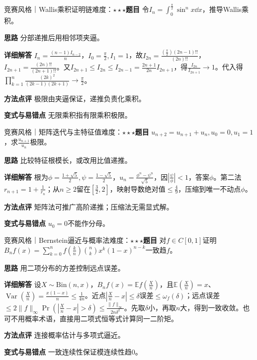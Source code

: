 \begin{example}{竞赛风格｜Wallis乘积证明链}{难度：$\star\star\star$}\label{deep:ex:limits_source_deep:wallis}\textbf{题目} 令$I_n=\int_0^{\frac{\pi}{2}}\sin^nx\dd x$，推导Wallis乘积。\par\textbf{思路} 分部递推后用相邻项夹逼。\par\textbf{详细解答} $I_n=\frac{(n-1)I_{n-2}}{n}$，$I_0=\frac{\pi}{2},I_1=1$，故$I_{2n}=\frac{(\frac{\pi}{2})(2n-1)!!}{(2n)!!}$，$I_{2n+1}=\frac{(2n)!!}{(2n+1)!!}$。又$I_{2n+1}\le I_{2n}\le I_{2n-1}=\frac{2n+1}{2n}I_{2n+1}$，得$\frac{I_{2n}}{I_{2n+1}}\to1$。代入得$\prod_{k=1}^n\frac{(2k)^2}{(2k-1)(2k+1)}\to\frac{\pi}{2}$。\par\textbf{方法点评} 极限由夹逼保证，递推负责化乘积。\par\textbf{变式与易错点} 无限乘积指有限乘积极限。\end{example}

\begin{example}{竞赛风格｜矩阵迭代与主特征值}{难度：$\star\star\star$}\label{deep:ex:limits_source_deep:matrix}\textbf{题目} $u_{n+2}=u_{n+1}+u_n,u_0=0,u_1=1$，求$\frac{u_{n+1}}{u_n}$极限。\par\textbf{思路} 比较特征根模长，或改用比值递推。\par\textbf{详细解答} 根为$\phi=\frac{1+\sqrt5}{2},\psi=\frac{1-\sqrt5}{2}$，$u_n=\frac{\phi^n-\psi^n}{\sqrt5}$，因$|\frac{\psi}{\phi}|<1$，答案$\phi$。第二法$r_{n+1}=1+\frac{1}{r_n}$；从$n\ge2$留在$[\frac{3}{2},2]$，映射导数绝对值$\le\frac{4}{9}$，压缩到唯一不动点$\phi$。\par\textbf{方法点评} 矩阵法可推广高阶递推；压缩法无需显式解。\par\textbf{变式与易错点} $u_0=0$不能作分母。\end{example}

\begin{example}{竞赛风格｜Bernstein逼近与概率法}{难度：$\star\star\star$}\label{deep:ex:limits_source_deep:probability}\textbf{题目} 对$f\in C[0,1]$证明$B_nf(x)=\sum_{k=0}^nf(\frac{k}{n})\binom nkx^k(1-x)^{n-k}$一致趋$f$。\par\textbf{思路} 用二项分布的方差控制远点误差。\par\textbf{详细解答} 设$X\sim\mathrm{Bin}(n,x)$，$B_nf(x)=\mathbb E f(\frac{X}{n})$，且$\mathbb E(\frac{X}{n})=x$、$\operatorname{Var}(\frac{X}{n})=\frac{x(1-x)}{n}\le\frac{1}{4n}$。近点$|\frac{X}{n}-x|\le\delta$误差$\le\omega_f(\delta)$；远点误差$\le2\|f\|_\infty\Pr(|\frac{X}{n}-x|>\delta)\le\frac{\|f\|_\infty}{2n\delta^2}$。先取$\delta$小，再取$n$大，得到一致收敛。也可不用概率术语，直接用二项式恒等式计算同一二阶矩。\par\textbf{方法点评} 连接概率估计与多项式逼近。\par\textbf{变式与易错点} 一致连续性保证模连续性趋0。\end{example}

